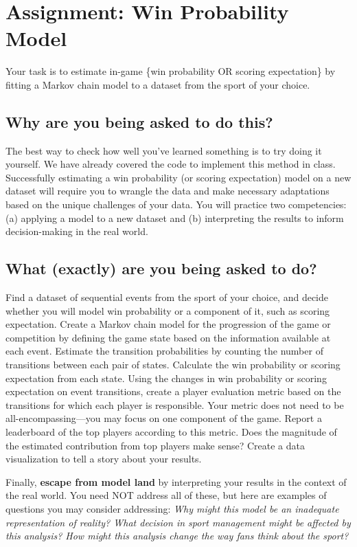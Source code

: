 \documentclass{article}
\begin{document}
  \section*{\sc Assignment: Win Probability Model}

    Your task is to estimate in-game \{win probability OR scoring expectation\} by fitting a Markov chain model to a dataset from the sport of your choice.
  
    \subsection*{\sc Why are you being asked to do this?}

      The best way to check how well you've learned something is to try doing it yourself. We have already covered the code to implement this method in class. Successfully estimating a win probability (or scoring expectation) model on a new dataset will require you to wrangle the data and make necessary adaptations based on the unique challenges of your data. You will practice two competencies: (a) applying a model to a new dataset and (b) interpreting the results to inform decision-making in the real world.

    \subsection*{\sc What (exactly) are you being asked to do?}

      Find a dataset of sequential events from the sport of your choice, and decide whether you will model win probability or a component of it, such as scoring expectation. Create a Markov chain model for the progression of the game or competition by defining the game state based on the information available at each event. Estimate the transition probabilities by counting the number of transitions between each pair of states. Calculate the win probability or scoring expectation from each state. Using the changes in win probability or scoring expectation on event transitions, create a player evaluation metric based on the transitions for which each player is responsible. Your metric does not need to be all-encompassing---you may focus on one component of the game. Report a leaderboard of the top players according to this metric. Does the magnitude of the estimated contribution from top players make sense? Create a data visualization to tell a story about your results.

      Finally, {\bf escape from model land} by interpreting your results in the context of the real world. You need NOT address all of these, but here are examples of questions you may consider addressing: {\it Why might this model be an inadequate representation of reality? What decision in sport management might be affected by this analysis? How might this analysis change the way fans think about the sport?}
\end{document}

